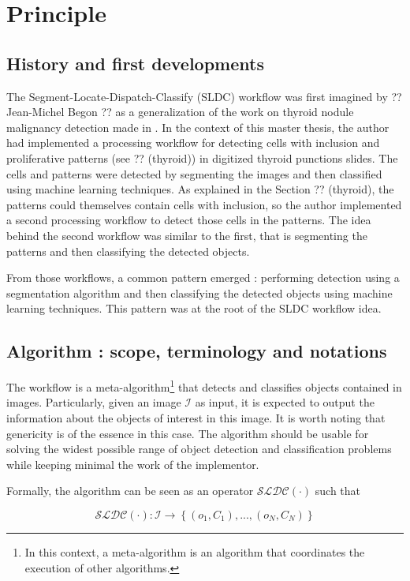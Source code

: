 \section{Principle}
\subsection{History and first developments}
\label{ssec:history_first_dev}
The Segment-Locate-Dispatch-Classify (SLDC) workflow was first imagined by ?? Jean-Michel Begon ?? as a generalization of the work on thyroid nodule malignancy detection made in \cite{adeblire2013}. In the context of this master thesis, the author had implemented a processing workflow for detecting cells with inclusion and proliferative patterns (see ?? (thyroid)) in digitized thyroid punctions slides. The cells and patterns were detected by segmenting the images and then classified using machine learning techniques. As explained in the Section ?? (thyroid), the patterns could themselves contain cells with inclusion, so the author implemented a second processing workflow to detect those cells in the patterns. The idea behind the second workflow was similar to the first, that is segmenting the patterns and then classifying the detected objects. 

From those workflows, a common pattern emerged : performing detection using a segmentation algorithm and then classifying the detected objects using machine learning techniques. This pattern was at the root of the SLDC workflow idea. 

\subsection{Algorithm : scope, terminology and notations}
The workflow is a meta-algorithm\footnote{In this context, a meta-algorithm is an algorithm that coordinates the execution of other algorithms.} that detects and classifies objects contained in images. Particularly, given an image $\mathcal{I}$ as input, it is expected to output the information about the objects of interest in this image. It is worth noting that genericity is of the essence in this case. The algorithm should be usable for solving the widest possible range of object detection and classification problems while keeping minimal the work of the implementor.
 
Formally, the algorithm can be seen as an operator $\mathcal{SLDC}(\cdot)$ such that

\begin{equation}
	\label{eqn:workflow_operator}
	\mathcal{SLDC}(\cdot) : \mathcal{I} \rightarrow \left\{(o_1,C_1),...,(o_N, C_N)\right\}
\end{equation}

